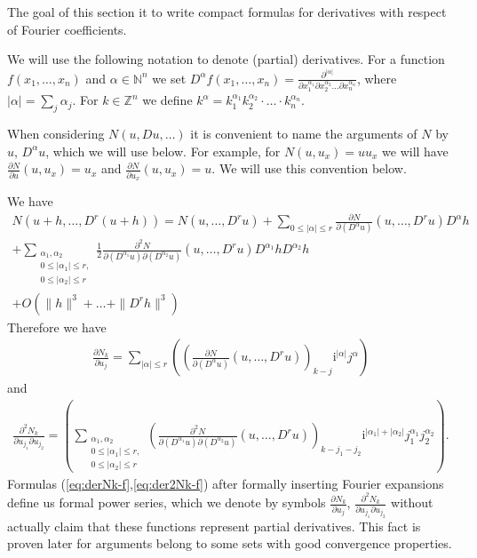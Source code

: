 The goal of this section it to write  compact formulas for derivatives with respect of Fourier coefficients.

We will use the following notation to denote (partial) derivatives. For a function $f(x_1,\dots,x_n)$ and $\alpha \in \mathbb{N}^n$ we set  $D^\alpha f(x_1,\dots,x_n)=\frac{\partial^{|\alpha|}}{\partial x_1^{\alpha_1} \partial x_2^{\alpha_2}\dots \partial x_n^{\alpha_n}}$, where $|\alpha|=\sum_j \alpha_j$.
For $k \in \mathbb{Z}^n$ we define $k^\alpha= k_1^{\alpha_1} k_2^{\alpha_2} \cdot \dots \cdot k_n^{\alpha_n}$.

When considering $N(u,Du,\dots)$ it is convenient to name the arguments of $N$ by $u$, $D^\alpha u$, which we will use below. For example, for $N(u,u_x)=uu_x$ we will
have $\frac{\partial N}{\partial u}(u,u_x)=u_x$ and  $\frac{\partial N}{\partial u_x}(u,u_x)=u$. We will use this convention below.



We have
\begin{multline*}
   N(u+h,\dots,D^r(u+h))= N(u,\dots,D^ru)
    + \sum_{0\leq |\alpha| \leq r } \frac{\partial N}{\partial (D^\alpha u)}(u,\dots,D^ru)D^\alpha h \\
   + \sum_{\substack{\alpha_1,\alpha_2\\  0\leq |\alpha_1|\leq r,\\ 0 \leq |\alpha_2|\leq r}} \frac{1}{2} \frac{\partial^2 N}{\partial (D^{\alpha_1}u) \partial(D^{\alpha_2}u)}(u,\dots,D^ru) D^{\alpha_1}h D^{\alpha_2}h\\
   + O(\|h\|^3+\ldots+\|D^rh\|^3)
\end{multline*}
Therefore we  have
\begin{eqnarray}
  \frac{\partial N_k}{\partial u_j} = \sum_{|\alpha| \leq r}\left(\left(\frac{\partial N}{\partial (D^\alpha u)}(u,\dots,D^ru)\right)_{k-j}\mathrm{i}^{|\alpha|} j^\alpha\right)  \label{eq:derNk-f}
\end{eqnarray}
and
\begin{eqnarray}
  \frac{\partial^2 N_k}{\partial u_{j_1}  \partial u_{j_2}} = \left(\sum_{\substack{\alpha_1,\alpha_2\\  0\leq |\alpha_1|\leq r, \\ 0 \leq |\alpha_2|\leq r}}\left(\frac{\partial^2 N}{\partial(D^{\alpha_1}u)  \partial(D^{\alpha_2} u) }(u,\dots,D^ru)\right)_{k-j_1-j_2}\mathrm{i}^{|\alpha_1|+|\alpha_2|}j_1^{\alpha_1} j_2^{\alpha_2}\right). \label{eq:der2Nk-f}
\end{eqnarray}
Formulas (\ref{eq:derNk-f},\ref{eq:der2Nk-f}) after formally inserting Fourier expansions define us formal power series, which we denote by symbols $ \frac{\partial N_k}{\partial u_j}$, $\frac{\partial^2 N_k}{\partial u_{j_1}  \partial u_{j_2}}$ without actually claim that these functions represent partial derivatives. This fact is proven later for
arguments belong to some sets with good convergence properties.

